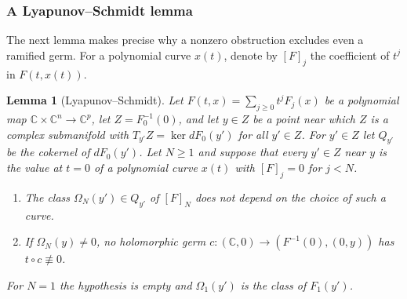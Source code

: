 \documentclass[11pt]{amsart}
\newenvironment{alphalist}{\begin{enumerate}\renewcommand{\labelenumi}{(\alph{enumi})}%
  \renewcommand{\theenumi}{\alph{enumi}}}{\end{enumerate}}
\newtheorem{lemma}[theorem]{Lemma}
\theoremstyle{definition}
\theoremstyle{remark}
\newcommand{\C}{\mathbb{C}}
\begin{document}
\subsubsection{A Lyapunov--Schmidt lemma}\label{d4-ls}
{The next lemma makes precise why a nonzero obstruction excludes even a ramified
germ. For a polynomial curve $x(t)$, denote by $[F]_j$ the coefficient of $t^j$ in
$F(t,x(t))$.}

\begin{lemma}[Lyapunov--Schmidt]\label{lem:d4-ls}
Let $F(t,x)=\sum_{j\ge0}t^jF_j(x)$ be a polynomial map $\C\times\C^n\to\C^p$, let
$Z=F_0^{-1}(0)$, and let $y\in Z$ be a point near which $Z$ is a complex submanifold with
$T_{y'}Z=\ker dF_0(y')$ for all $y'\in Z$.  For $y'\in Z$ let $Q_{y'}$ be the cokernel of
$dF_0(y')$.  Let $N\ge1$ and suppose that every $y'\in Z$ near $y$ is the value at $t=0$ of a
polynomial curve $x(t)$ with $[F]_j=0$ for $j<N$.
\begin{alphalist}
  \item The class $\Omega_N(y')\in Q_{y'}$ of $[F]_N$ does not depend on the choice of such a curve.
  \item If $\Omega_N(y)\ne0$, no holomorphic germ $c\colon(\C,0)\to(F^{-1}(0),(0,y))$ has
  $t\circ c\not\equiv0$.
\end{alphalist}
For $N=1$ the hypothesis is empty and $\Omega_1(y')$ is the class of $F_1(y')$.
\end{lemma}
\end{document}

